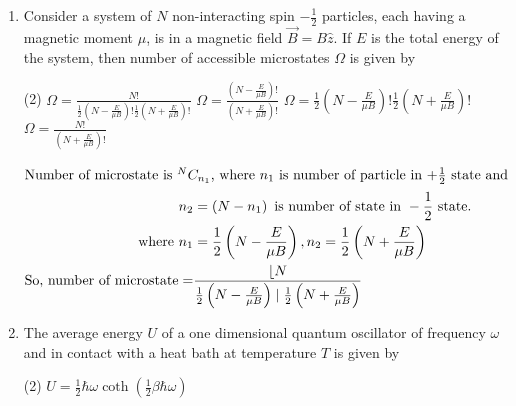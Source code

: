 \begin{enumerate}
	\begin{tasks}(4)
		\task[\textbf{A.}] Zero
		\task[\textbf{B.}]  $N k$
		\task[\textbf{C.}]  $\frac{1}{2} N k$
		\task[\textbf{D.}] $N k \ln (2)$
	\end{tasks}
	\begin{answer}
		There are two microstates possible for spin $\frac{1}{2}$ particle, so entropy is given by $N k \ln (2)$\\\\
		So the correct answer is \textbf{Option (D)}
	\end{answer}	
	\item Consider a system of $N$ non-interacting spin $-\frac{1}{2}$ particles, each having a magnetic moment $\mu$, is in a magnetic field $\vec{B}=B \hat{z} .$ If $E$ is the total energy of the system, then number of accessible microstates $\Omega$ is given by
	{}
	\begin{tasks}(2)
		\task[\textbf{A.}] $\Omega=\frac{N !}{\frac{1}{2}\left(N-\frac{E}{\mu B}\right) ! \frac{1}{2}\left(N+\frac{E}{\mu B}\right) !}$
		\task[\textbf{B.}] $\Omega=\frac{\left(N-\frac{E}{\mu B}\right) !}{\left(N+\frac{E}{\mu B}\right) !}$
		\task[\textbf{C.}] $\Omega=\frac{1}{2}\left(N-\frac{E}{\mu B}\right) ! \frac{1}{2}\left(N+\frac{E}{\mu B}\right) !$
		\task[\textbf{D.}] $\Omega=\frac{N !}{\left(N+\frac{E}{\mu B}\right) !}$
	\end{tasks}
	\begin{answer}
		\begin{align*}
		\intertext{Number of microstate is ${ }^{N} C_{n_{1}}$, where $n_{1}$ is number of particle in $+\frac{1}{2}$ state and}
		n_{2}&=\left(N-n_{1}\right)\text{ is number of state in }-\frac{1}{2}\text{ state.}\\
		\text{	where }n_{1}&=\frac{1}{2}\left(N-\frac{E}{\mu B}\right), n_{2}=\frac{1}{2}\left(N+\frac{E}{\mu B}\right)\\
		\text{So, number of microstate}=&\frac{\lfloor N}{\frac{1}{2}\left(N-\frac{E}{\mu B}\right) \mid \frac{1}{2}\left(N+\frac{E}{\mu B}\right)}
		\end{align*}
	\end{answer}	
	\item The average energy $U$ of a one dimensional quantum oscillator of frequency $\omega$ and in contact with a heat bath at temperature $T$ is given by
	{}
	\begin{tasks}(2)
		\task[\textbf{A.}] $U=\frac{1}{2} \hbar \omega \operatorname{coth}\left(\frac{1}{2} \beta \hbar \omega\right)$

\end{tasks}
\end{enumerate}
